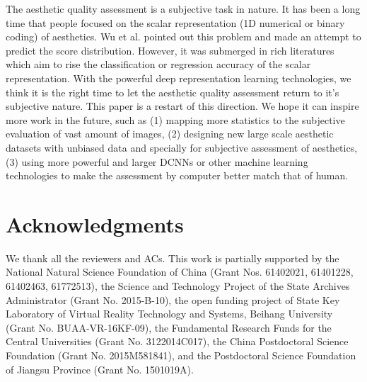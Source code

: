 \documentclass[letterpaper]{article} %
\begin{document}


The aesthetic quality assessment is a subjective task in nature. It has been a long time that people focused on the scalar representation (1D numerical or binary coding) of aesthetics. Wu et al. \cite{WuICCV2011} pointed out this problem and made an attempt to predict the score distribution. However, it was submerged in rich literatures which aim to rise the classification or regression accuracy of the scalar representation. With the powerful deep representation learning technologies, we think it is the right time to let the aesthetic quality assessment return to it's subjective nature. This paper is a restart of this direction. We hope it can inspire more work in the future, such as (1) mapping more statistics to the subjective evaluation of vast amount of images, (2) designing new large scale aesthetic datasets with unbiased data and specially for subjective assessment of aesthetics, (3) using more powerful and larger DCNNs or other machine learning technologies to make the assessment by computer better match that of human.





\section{ Acknowledgments}
We thank all the reviewers and ACs. This work is partially supported by the National Natural Science Foundation of China (Grant Nos. 61402021, 61401228, 61402463, 61772513), the Science and Technology Project of the State Archives Administrator (Grant No. 2015-B-10), the open funding project of State Key Laboratory of Virtual Reality Technology and Systems, Beihang University (Grant No. BUAA-VR-16KF-09), the Fundamental Research Funds for the Central Universities (Grant No. 3122014C017), the China Postdoctoral Science Foundation (Grant No. 2015M581841), and the Postdoctoral Science Foundation of Jiangsu Province (Grant No. 1501019A).


{\small


}
\end{document}
